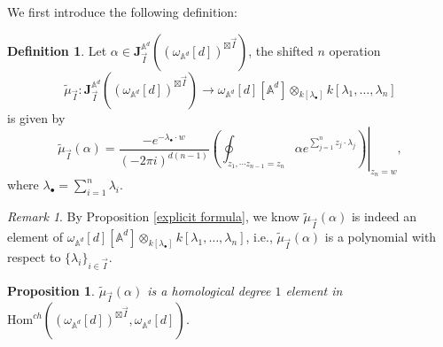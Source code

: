 \documentclass[11pt]{amsart}
\newtheorem{prop}[thm]{Proposition}
\theoremstyle{definition}
\newtheorem{defn}[thm]{Definition}
\theoremstyle{remark}
\newtheorem{rem}[thm]{Remark}
\numberwithin{equation}{section}
\begin{document}
We first introduce the following definition:
\begin{defn}
    Let $\alpha\in \mathbf{J}_{\vec{I}}^{\mathbb{A}^{d}}((\omega_{\mathbb{A}^{d}}[d])^{\boxtimes\vec{I}})$, the shifted $n$ operation
    $$
    \tilde{\mu}_{\vec{I}}:\mathbf{J}_{\vec{I}}^{\mathbb{A}^{d}}((\omega_{\mathbb{A}^{d}}[d])^{\boxtimes\vec{I}})\rightarrow \omega_{\mathbb{A}^{d}}[d][\mathbb{A}^{d}]\otimes_{k[\lambda_{\bullet}]}k[\lambda_{1},\dots,\lambda_{n}]
    $$
    is given by
    $$
    \tilde{\mu}_{\vec{I}}(\alpha)=\frac{-e^{-\lambda_{\bullet}\cdot w}}{(-2\pi i)^{d(n-1)}}\left.\left(\oint_{z_{1},\cdots z_{n-1}=z_{n}}\alpha e^{\sum_{j=1}^{n}z_{j}\cdot \lambda_{j}}\right)\right|_{z_n=w},
    $$
    where $\lambda_{\bullet}=\sum_{i=1}^{n}\lambda_{i}$.
\end{defn}
\begin{rem}
    By Proposition \ref{explicit formula}, we know $\tilde{\mu}_{\vec{I}}(\alpha)$ is indeed an element of $\omega_{\mathbb{A}^{d}}[d][\mathbb{A}^{d}]\otimes_{k[\lambda_{\bullet}]}k[\lambda_{1},\dots,\lambda_{n}]$, i.e., $\tilde{\mu}_{\vec{I}}(\alpha)$ is a polynomial with respect to $\{\lambda_{i}\}_{i\in\vec{I}}$.
\end{rem}
\begin{prop}
    $\tilde{\mu}_{\vec{I}}(\alpha)$ is a homological degree $1$ element in $\mathrm{Hom}^{ch}((\omega_{\mathbb{A}^{d}}[d])^{\boxtimes\vec{I}},\omega_{\mathbb{A}^{d}}[d])$.
\end{prop}
\end{document}
